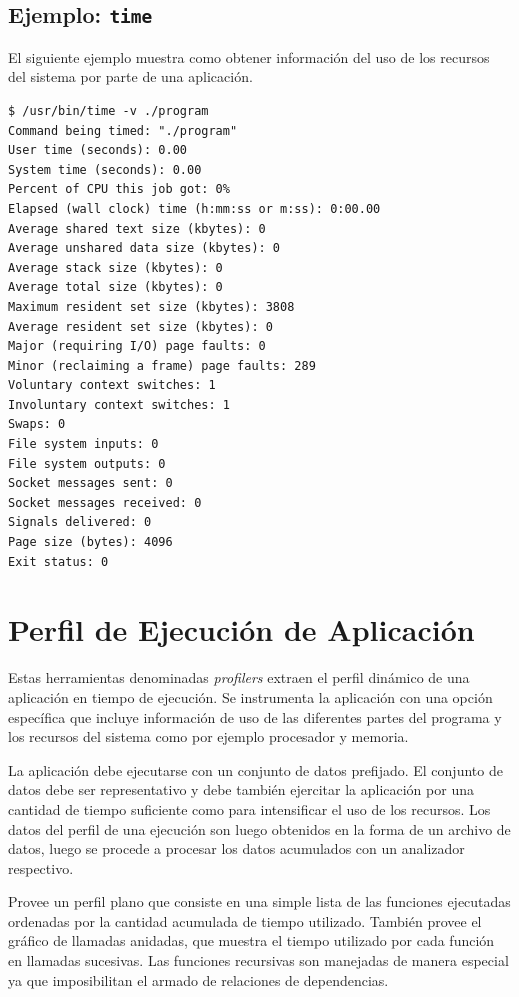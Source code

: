 \documentclass[a4paper]{report}
\begin{document}
\subsection{Ejemplo: {\tt time}}

El siguiente ejemplo muestra como obtener información del uso de los recursos del sistema por parte de una aplicación.

\begin{lstlisting} 
$ /usr/bin/time -v ./program
Command being timed: "./program"
User time (seconds): 0.00
System time (seconds): 0.00
Percent of CPU this job got: 0%
Elapsed (wall clock) time (h:mm:ss or m:ss): 0:00.00
Average shared text size (kbytes): 0
Average unshared data size (kbytes): 0
Average stack size (kbytes): 0
Average total size (kbytes): 0
Maximum resident set size (kbytes): 3808
Average resident set size (kbytes): 0
Major (requiring I/O) page faults: 0
Minor (reclaiming a frame) page faults: 289
Voluntary context switches: 1
Involuntary context switches: 1
Swaps: 0
File system inputs: 0
File system outputs: 0
Socket messages sent: 0
Socket messages received: 0
Signals delivered: 0
Page size (bytes): 4096
Exit status: 0
\end{lstlisting}

\section{Perfil de Ejecución de Aplicación}

Estas herramientas denominadas {\it profilers} extraen el perfil dinámico de una aplicación en tiempo de ejecución. 
Se instrumenta la aplicación con una opción específica que incluye información de uso de las diferentes partes del programa y los recursos del sistema como por ejemplo procesador y memoria.

\bigskip

La aplicación debe ejecutarse con un conjunto de datos prefijado. El conjunto de
datos debe ser representativo y debe también ejercitar la aplicación por
una cantidad de tiempo suficiente como para intensificar el uso de los
recursos. Los datos del perfil de una ejecución son luego obtenidos en la
forma de un archivo de datos, luego se procede a procesar los datos acumulados
con un analizador respectivo.

\bigskip

Provee un perfil plano que consiste en una simple lista de las funciones
ejecutadas ordenadas por la cantidad acumulada de tiempo utilizado.
También provee el gráfico de llamadas anidadas, que muestra el tiempo
utilizado por cada función en llamadas sucesivas. Las funciones recursivas
son manejadas de manera especial ya que imposibilitan el armado de relaciones
de dependencias.
\end{document}
